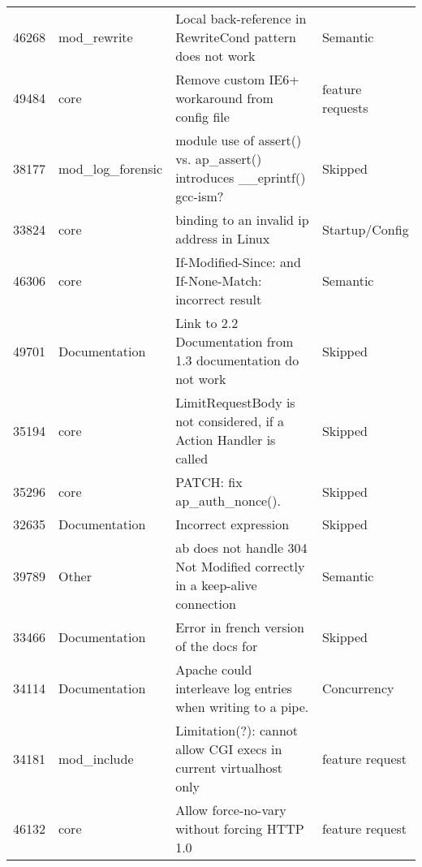 \begin{longtable}[c]{p{1cm}p{3cm}p{6cm}p{4cm}}
46268  & mod\_rewrite       & Local back-reference in RewriteCond pattern does not work                                                 & Semantic          \\
49484  & core               & Remove custom IE6+ workaround from config file                                                                 & feature requests  \\
38177  & mod\_log\_forensic & module use of assert() vs. ap\_assert() introduces \_\_eprintf() gcc-ism? & Skipped           \\
33824  & core               & binding to an invalid ip address in Linux                                                                      & Startup/Config    \\
46306  & core               & If-Modified-Since: and If-None-Match: incorrect result                                                         & Semantic          \\
49701  & Documentation      & Link to 2.2 Documentation from 1.3 documentation do not work                                                   & Skipped           \\
35194  & core               & LimitRequestBody is not considered, if a Action Handler is called                                              & Skipped           \\
35296  & core               & PATCH: fix ap\_auth\_nonce().                                                                                  & Skipped           \\
32635  & Documentation      & Incorrect expression & Skipped           \\
39789  & Other              & ab does not handle 304 Not Modified correctly in a keep-alive connection                                       & Semantic          \\
33466  & Documentation      & Error in french version of the docs for & Skipped           \\
34114  & Documentation      & Apache could interleave log entries when writing to a pipe.                                                    & Concurrency       \\
34181  & mod\_include       & Limitation(?): cannot allow CGI execs in current virtualhost only                                              & feature request   \\
46132  & core               & Allow force-no-vary without forcing HTTP 1.0                                                                   & feature request   \\

\end{longtable}
